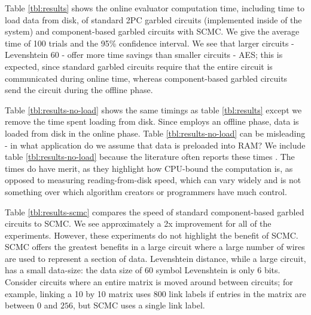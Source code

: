 Table \ref{tbl:results} shows the online evaluator computation time, including time to load data from disk, of standard 2PC garbled circuits (implemented inside of the \CompGC system) and component-based garbled circuits with SCMC.
We give the average time of 100 trials and the 95\% confidence interval.
We see that larger circuits - Levenshtein 60 - offer more time savings than smaller circuits - AES; this is expected, since standard garbled circuits require that the entire circuit is communicated during online time, whereas component-based garbled circuits send the circuit during the offline phase. 

Table \ref{tbl:results-no-load} shows the same timings as table \ref{tbl:results} except we remove the time spent loading from disk.
Since \CompGC employs an offline phase, data is loaded from disk in the online phase. 
Table \ref{tbl:results-no-load} can be misleading - in what application do we assume that data is preloaded into RAM?
We include table \ref{tbl:results-no-load} because the literature often reports these times \cite{blazing-fast}. 
The times do have merit, as they highlight how CPU-bound the computation is, as opposed to measuring reading-from-disk speed, which can vary widely and is not something over which algorithm creators or programmers have much control. 

Table \ref{tbl:results-scmc} compares the speed of standard component-based garbled circuits to SCMC.
We see approximately a 2x improvement for all of the experiments. 
However, these experiments do not highlight the benefit of SCMC. 
SCMC offers the greatest benefits in a large circuit where a large number of wires are used to represent a section of data.
Levenshtein distance, while a large circuit, has a small data-size: the data size of 60 symbol Levenshtein is only 6 bits. 
Consider circuits where an entire matrix is moved around between circuits; for example, linking a 10 by 10 matrix uses $800$ link labels if entries in the matrix are between $0$ and $256$, but SCMC uses a single link label.

\newpage



\newpage


